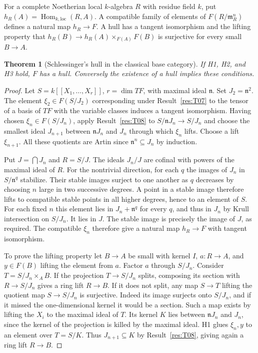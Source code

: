 \documentclass[11pt,oneside,openany]{book}
\newtheorem{theorem}{Theorem}[chapter]
\theoremstyle{definition}
\theoremstyle{remark}
\begin{document}
For a complete Noetherian local \(k\)-algebra \(R\) with residue
field \(k\), put \(h_R(A)=\operatorname{Hom}_{k,\mathrm{loc}}(R,A)\).
A compatible family of elements of \(F(R/\mathfrak m_R^n)\) defines
a natural map \(h_R\to F\). A hull has a tangent isomorphism and the
lifting property that \(h_R(B)\to h_R(A)\times_{F(A)}F(B)\)
is surjective for every small \(B\to A\).

\begin{theorem}[Schlessinger's hull in the classical base category]\label{res:T09}
If H1, H2, and H3 hold, \(F\) has a hull. Conversely the
existence of a hull implies these conditions.
\end{theorem}
\begin{proof}
Let \(S=k[[X_1,\ldots,X_r]]\), \(r=\dim TF\), with maximal ideal
\(\mathfrak n\). Set \(J_2=\mathfrak n^2\). The element
\(\xi_2\in F(S/J_2)\) corresponding under Result~\ref{res:T07}
to the tensor of a basis of \(TF\) with the variable classes induces
a tangent isomorphism. Having chosen \(\xi_n\in F(S/J_n)\), apply
Result~\ref{res:T08} to
\(S/\mathfrak n J_n\to S/J_n\) and choose the smallest ideal
\(J_{n+1}\) between \(\mathfrak n J_n\) and \(J_n\) through which
\(\xi_n\) lifts. Choose a lift \(\xi_{n+1}\).
All these quotients are Artin since \(\mathfrak n^n\subseteq J_n\)
by induction.

Put \(J=\bigcap J_n\) and \(R=S/J\). The ideals \(J_n/J\) are
cofinal with powers of the maximal ideal of \(R\).
For the nontrivial direction, for each \(q\) the images of \(J_n\) in
\(S/\mathfrak n^q\) stabilize. Their stable images surject to one
another as \(q\) decreases by choosing \(n\) large in two successive
degrees. A point in a stable image therefore lifts to compatible
stable points in all higher degrees, hence to an element of \(S\).
For each fixed \(n\) this element lies in \(J_n+\mathfrak n^q\)
for every \(q\), and thus in \(J_n\) by Krull intersection on
\(S/J_n\). It lies in \(J\). The stable image is precisely the
image of \(J\), as required. The compatible \(\xi_n\) therefore
give a natural map \(h_R\to F\) with tangent isomorphism.

To prove the lifting property let \(B\to A\) be small with kernel
\(I\), \(a:R\to A\), and \(y\in F(B)\) lifting the element from \(a\).
Factor \(a\) through \(S/J_n\). Consider \(T=S/J_n\times_A B\).
If the projection \(T\to S/J_n\) splits, composing its section
with \(R\to S/J_n\) gives a ring lift \(R\to B\).
If it does not split, any map \(S\to T\) lifting the quotient map
\(S\to S/J_n\) is surjective. Indeed its image surjects onto
\(S/J_n\), and if it missed the one-dimensional kernel it would
be a section. Such a map exists by lifting the \(X_i\) to the
maximal ideal of \(T\). Its kernel \(K\) lies between
\(\mathfrak n J_n\) and \(J_n\), since the kernel of the projection
is killed by the maximal ideal. H1 glues \(\xi_n,y\) to an
element over \(T=S/K\). Thus \(J_{n+1}\subseteq K\) by
Result~\ref{res:T08}, giving again a ring lift \(R\to B\).


\end{proof}
\end{document}

